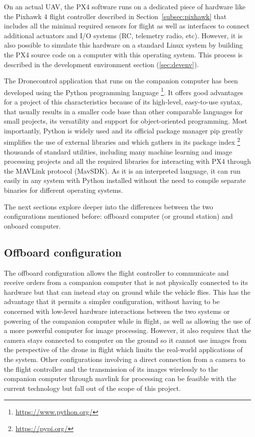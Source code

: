 On an actual UAV, the PX4 software runs on a dedicated piece of hardware like the Pixhawk 4 flight controller described in Section~\ref{subsec:pixhawk} that includes all the minimal required sensors for flight as well as interfaces to connect additional actuators and I/O systems (RC, telemetry radio, etc).
However, it is also possible to simulate this hardware on a standard Linux system by building the PX4 source code on a computer with this operating system.
This process is described in the development environment section (\ref{sec:devenv}).

The Dronecontrol application that runs on the companion computer has been developed using the Python programming language \footnote{\url{https://www.python.org/}}.
It offers good advantages for a project of this characteristics because of its high-level,
easy-to-use syntax, that usually results in a smaller code base than other comparable languages for small projects, its versatility and support for object-oriented programming. 
Most importantly, Python is widely used and its official package manager \gls{pip} greatly simplifies the use of external libraries and which gathers in its package index \footnote{\url{https://pypi.org/}} thousands of standard utilities,
including many machine learning and image processing projects and all the required libraries for interacting with PX4 through the MAVLink protocol (MavSDK).
As it is an interpreted language, it can run easily in any system with Python installed without the need to compile separate binaries for different operating systems.

The next sections explore deeper into the differences between the two configurations mentioned before: offboard computer (or ground station) and onboard computer.

\subsection{Offboard configuration}
\label{subsec:offboard}

The offboard configuration allows the flight controller to communicate and receive orders from a companion computer that is not physically connected to its hardware but that can instead stay on ground while the vehicle flies.
This has the advantage that it permits a simpler configuration, without having to be concerned with low-level hardware interactions between the two systems or powering of the companion computer while in flight, as well as allowing the use of a more powerful computer for image processing.
However, it also requires that the camera stays connected to computer on the ground so it cannot use images from the perspective of the drone in flight which limits the real-world applications of the system.
Other configurations involving a direct connection from a camera to the flight controller and the transmission of its images wirelessly to the companion computer through mavlink for processing can be feasible with the current technology but fall out of the scope of this project.

